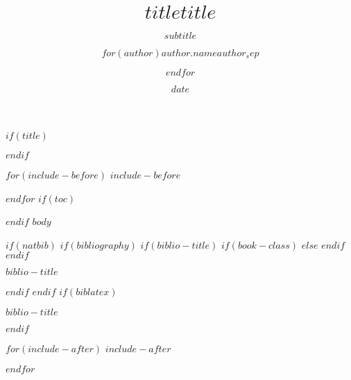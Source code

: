 \documentclass[$if(fontsize)$$fontsize$,$endif$$if(handout)$handout,$endif$$if(t)$t,$endif$$if(aspectratio)$aspectratio=$aspectratio$,$endif$]{beamer}
\title[$short_title$]{\vfill $title$}
\title{\vfill $title$}
\subtitle{$subtitle$}
\author[$short_author$]{$for(author)$$author.name$\inst{$author.inst$}$author_sep$ \and $endfor$}
\institute{$for(institute)$\inst{$institute.inst$} $institute.institute$ \and $endfor$}
\date{$date$}
\newif\ifbibliography
\begin{document}
$if(title)$
\begin{frame}
\titlepage
\end{frame}
$endif$

$for(include-before)$
$include-before$

$endfor$
$if(toc)$
\begin{frame}
\tableofcontents[hideallsubsections]
\end{frame}

$endif$
$body$

$if(natbib)$
$if(bibliography)$
$if(biblio-title)$
$if(book-class)$
\renewcommand\bibname{$biblio-title$}
$else$
\renewcommand\refname{$biblio-title$}
$endif$
$endif$
\begin{frame}[allowframebreaks]{$biblio-title$}
\bibliographytrue

\end{frame}

$endif$
$endif$
$if(biblatex)$
\begin{frame}[allowframebreaks]{$biblio-title$}
\bibliographytrue
\printbibliography[heading=none]
\end{frame}
$endif$

$for(include-after)$
$include-after$

$endfor$
\end{document}
